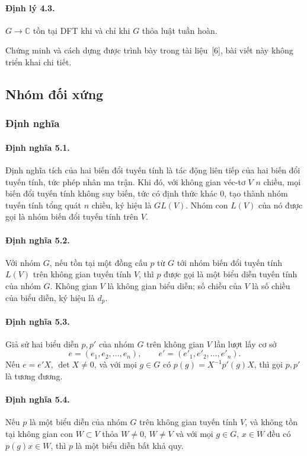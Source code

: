 \documentclass[11pt]{article}
\begin{document}
\paragraph{Định lý 4.3.}
$G\to\mathbb C$ tồn tại DFT khi và chỉ khi $G$ thỏa luật tuần hoàn.

Chứng minh và cách dựng được trình bày trong tài liệu~[6], bài viết này không
triển khai chi tiết.

\subsection{Nhóm đối xứng}

\subsubsection{Định nghĩa}

\paragraph{Định nghĩa 5.1.}
Định nghĩa tích của hai biến đổi tuyến tính là tác động liên tiếp của hai biến
đổi tuyến tính, tức phép nhân ma trận. Khi đó, với không gian véc-tơ $V$ $n$
chiều, mọi biến đổi tuyến tính không suy biến, tức có định thức khác $0$, tạo
thành nhóm tuyến tính tổng quát $n$ chiều, ký hiệu là $GL(V)$. Nhóm con $L(V)$
của nó được gọi là nhóm biến đổi tuyến tính trên $V$.

\paragraph{Định nghĩa 5.2.}
Với nhóm $G$, nếu tồn tại một đồng cấu $p$ từ $G$ tới nhóm biến đổi tuyến tính
$L(V)$ trên không gian tuyến tính $V$, thì $p$ được gọi là một biểu diễn tuyến
tính của nhóm $G$. Không gian $V$ là không gian biểu diễn; số chiều của $V$ là
số chiều của biểu diễn, ký hiệu là $d_p$.

\paragraph{Định nghĩa 5.3.}
Giả sử hai biểu diễn $p,p'$ của nhóm $G$ trên không gian $V$ lần lượt lấy cơ sở
\[
  e=(e_1,e_2,\ldots,e_n),\qquad
  e'=(e'_1,e'_2,\ldots,e'_n).
\]
Nếu $e=e'X$, $\det X\ne0$, và với mọi $g\in G$ có
$p(g)=X^{-1}p'(g)X$, thì gọi $p,p'$ là tương đương.

\paragraph{Định nghĩa 5.4.}
Nếu $p$ là một biểu diễn của nhóm $G$ trên không gian tuyến tính $V$, và không
tồn tại không gian con $W\subset V$ thỏa $W\ne0$, $W\ne V$ và với mọi
$g\in G$, $x\in W$ đều có $p(g)x\in W$, thì $p$ là một biểu diễn bất khả quy.
\end{document}
